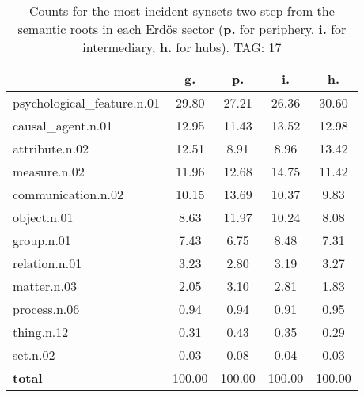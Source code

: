 \begin{table}[h!]
\begin{center}
\begin{tabular}{| l || c | c | c | c |}\hline
 & {\bf g.} & {\bf p.} & {\bf i.} & {\bf h.} \\\hline\hline
psychological\_feature.n.01 & 29.80  & 27.21  & 26.36  & 30.60 \\\hline
causal\_agent.n.01 & 12.95  & 11.43  & 13.52  & 12.98 \\\hline
attribute.n.02 & 12.51  & 8.91  & 8.96  & 13.42 \\\hline
measure.n.02 & 11.96  & 12.68  & 14.75  & 11.42 \\\hline
communication.n.02 & 10.15  & 13.69  & 10.37  & 9.83 \\\hline
object.n.01 & 8.63  & 11.97  & 10.24  & 8.08 \\\hline
group.n.01 & 7.43  & 6.75  & 8.48  & 7.31 \\\hline
relation.n.01 & 3.23  & 2.80  & 3.19  & 3.27 \\\hline
matter.n.03 & 2.05  & 3.10  & 2.81  & 1.83 \\\hline
process.n.06 & 0.94  & 0.94  & 0.91  & 0.95 \\\hline
thing.n.12 & 0.31  & 0.43  & 0.35  & 0.29 \\\hline
set.n.02 & 0.03  & 0.08  & 0.04  & 0.03 \\\hline\hline
{{\bf total}} & 100.00  & 100.00  & 100.00  & 100.00 \\\hline
\end{tabular}
\caption{Counts for the most incident synsets two step from the semantic roots in each Erd\"os sector ({\bf p.} for periphery, {\bf i.} for intermediary, {\bf h.} for hubs). TAG: 17}
\end{center}
\end{table}